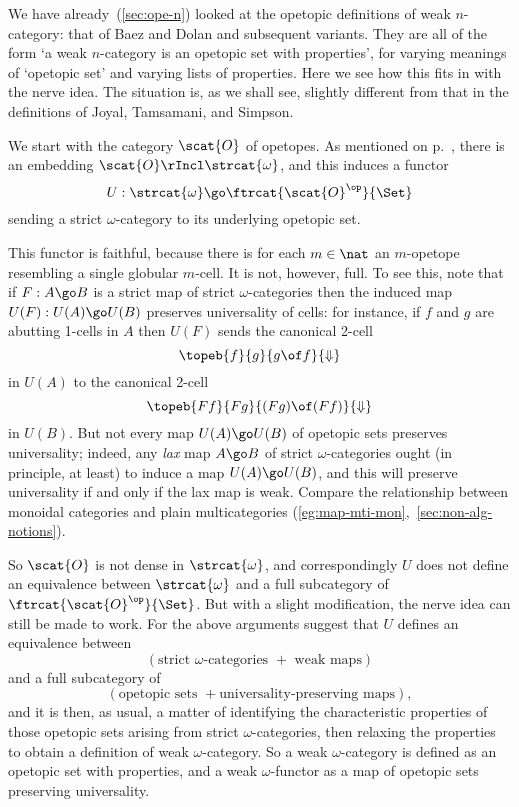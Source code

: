 %
%
%
%
%
%
%



We have already~(\ref{sec:ope-n}) looked at the opetopic definitions of
weak $n$-category: that of Baez and Dolan and subsequent variants.  They
are all of the form `a weak $n$-category is an opetopic set with
properties', for varying meanings of `opetopic set' and varying lists of
properties.  Here we see how this fits in with the nerve idea.  The
situation is, as we shall see, slightly different from that in the
definitions of Joyal, Tamsamani, and Simpson.

We start with the category $\scat{O}$ of opetopes.  As mentioned
on p.~\pageref{p:ope-to-n-cat}, there is an embedding $\scat{O} \rIncl
\strcat{\omega}$, and this induces a functor 
\[
U: \strcat{\omega} \go \ftrcat{\scat{O}^\op}{\Set}
\]
sending a strict $\omega$-category to its underlying opetopic set.

This functor is faithful, because there is for each $m\in\nat$ an
$m$-opetope resembling a single globular $m$-cell.  It is not, however,
full.  To see this, note that if $F: A \go B$ is a strict map of strict
$\omega$-categories then the induced map $U(F): U(A) \go U(B)$ preserves
universality%
%
%
of cells: for instance, if $f$ and $g$ are abutting 1-cells in
$A$ then $U(F)$ sends the canonical 2-cell
\[
\topeb{f}{g}{g\of f}{\Downarrow}
\]
in $U(A)$ to the canonical 2-cell 
\[
\topeb{Ff}{Fg}{(Fg)\of (Ff)}{\Downarrow}
\]
in $U(B)$.  But not every map $U(A) \go U(B)$ of opetopic sets preserves
universality; indeed, any \emph{lax} map $A \go B$ of strict
$\omega$-categories ought (in principle, at least) to induce a map $U(A)
\go U(B)$, and this will preserve universality if and only if the lax map
is weak.  Compare the relationship between monoidal categories and plain
multicategories (\ref{eg:map-mti-mon},~\ref{sec:non-alg-notions}).

So $\scat{O}$ is not dense in $\strcat{\omega}$, and correspondingly $U$
does not define an equivalence between $\strcat{\omega}$ and a full
subcategory of $\ftrcat{\scat{O}^\op}{\Set}$.  But with a slight
modification, the nerve idea can still be made to work.  For the above
arguments suggest that $U$ defines an equivalence between
\[
(\textrm{strict } \omega \textrm{-categories } + \textrm{ weak maps})
\]
and a full subcategory of 
\[
(\textrm{opetopic sets } + \textrm{universality-preserving maps}),
\]
and it is then, as usual, a matter of identifying the characteristic
properties of those opetopic sets arising from strict $\omega$-categories,
then relaxing the properties to obtain a definition of weak
$\omega$-category.  So a weak $\omega$-category is defined as an opetopic
set with properties, and a weak $\omega$-functor as a map of opetopic sets
preserving universality.%
%
%
%
%
%
%




